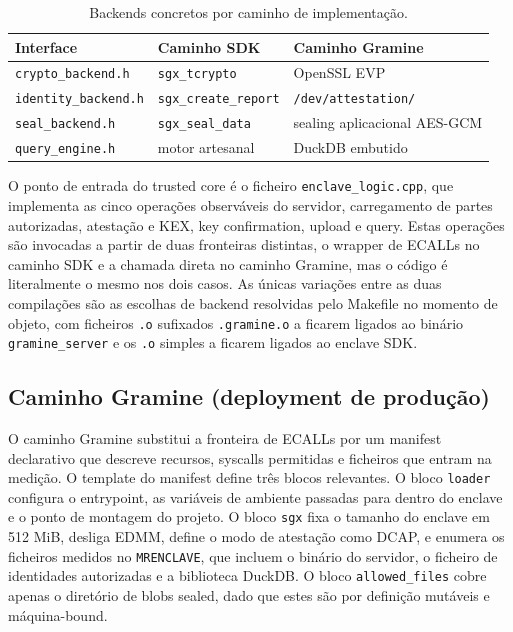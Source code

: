 \begin{table}[H]
\centering
\small
\begin{tabular}{lll}
\toprule
Interface & Caminho SDK & Caminho Gramine \\
\midrule
\texttt{crypto\_backend.h}   & \texttt{sgx\_tcrypto}      & OpenSSL EVP \\
\texttt{identity\_backend.h} & \texttt{sgx\_create\_report} & \texttt{/dev/attestation/} \\
\texttt{seal\_backend.h}     & \texttt{sgx\_seal\_data}   & sealing aplicacional AES-GCM \\
\texttt{query\_engine.h}     & motor artesanal           & DuckDB embutido \\
\bottomrule
\end{tabular}
\caption{Backends concretos por caminho de implementação.}
\label{tab:backends}
\end{table}

O ponto de entrada do trusted core é o ficheiro \texttt{enclave\_logic.cpp}, que implementa as cinco operações observáveis do servidor, carregamento de partes autorizadas, atestação e KEX, key confirmation, upload e query. Estas operações são invocadas a partir de duas fronteiras distintas, o wrapper de ECALLs no caminho SDK e a chamada direta no caminho Gramine, mas o código é literalmente o mesmo nos dois casos. As únicas variações entre as duas compilações são as escolhas de backend resolvidas pelo Makefile no momento de objeto, com ficheiros \texttt{.o} sufixados \texttt{.gramine.o} a ficarem ligados ao binário \texttt{gramine\_server} e os \texttt{.o} simples a ficarem ligados ao enclave SDK.

\subsection{Caminho Gramine (deployment de produção)}

O caminho Gramine substitui a fronteira de ECALLs por um manifest declarativo que descreve recursos, syscalls permitidas e ficheiros que entram na medição. O template do manifest define três blocos relevantes. O bloco \texttt{loader} configura o entrypoint, as variáveis de ambiente passadas para dentro do enclave e o ponto de montagem do projeto. O bloco \texttt{sgx} fixa o tamanho do enclave em 512 MiB, desliga EDMM, define o modo de atestação como DCAP, e enumera os ficheiros medidos no \texttt{MRENCLAVE}, que incluem o binário do servidor, o ficheiro de identidades autorizadas e a biblioteca DuckDB. O bloco \texttt{allowed\_files} cobre apenas o diretório de blobs sealed, dado que estes são por definição mutáveis e máquina-bound.

